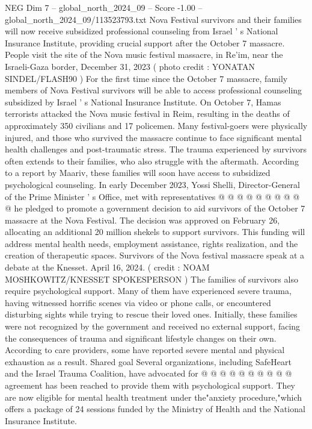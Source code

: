 \begin{textsample}{NEG Dim 7 – global\_north\_2024\_09 – Score -1.00 – global\_north\_2024\_09/113523793.txt}  \label{ex:f7_neg_378}
Nova Festival survivors and their families will now receive subsidized professional counseling from Israel ' s National Insurance Institute, providing crucial support after the October 7 massacre.
People visit the site of the Nova music festival massacre, in Re'im, near the Israeli-Gaza border, December 31, 2023 ( photo credit : YONATAN SINDEL/FLASH90 ) For the first time since the October 7 massacre, family members of Nova Festival survivors will be able to access professional counseling subsidized by Israel ' s National Insurance Institute.
On October 7, Hamas terrorists attacked the Nova music festival in Reim, resulting in the deaths of approximately 350 civilians and 17 policemen.
Many festival-goers were physically injured, and those who survived the massacre continue to face significant mental health challenges and post-traumatic stress.
The trauma experienced by survivors often extends to their families, who also struggle with the aftermath.
According to a report by Maariv, these families will soon have access to subsidized psychological counseling.
In early December 2023, Yossi Shelli, Director-General of the Prime Minister ' s Office, met with representatives @ @ @ @ @ @ @ @ @ @ he pledged to promote a government decision to aid survivors of the October 7 massacre at the Nova Festival.
The decision was approved on February 26, allocating an additional 20 million shekels to support survivors.
This funding will address mental health needs, employment assistance, rights realization, and the creation of therapeutic spaces.
Survivors of the Nova festival massacre speak at a debate at the Knesset.
April 16, 2024. ( credit : NOAM MOSHKOWITZ/KNESSET SPOKESPERSON ) The families of survivors also require psychological support.
Many of them have experienced severe trauma, having witnessed horrific scenes via video or phone calls, or encountered disturbing sights while trying to rescue their loved ones.
Initially, these families were not recognized by the government and received no external support, facing the consequences of trauma and significant lifestyle changes on their own.
According to care providers, some have reported severe mental and physical exhaustion as a result.
Shared goal Several organizations, including SafeHeart and the Israel Trauma Coalition, have advocated for @ @ @ @ @ @ @ @ @ @ agreement has been reached to provide them with psychological support.
They are now eligible for mental health treatment under the"anxiety procedure,"which offers a package of 24 sessions funded by the Ministry of Health and the National Insurance Institute.

\end{textsample}
